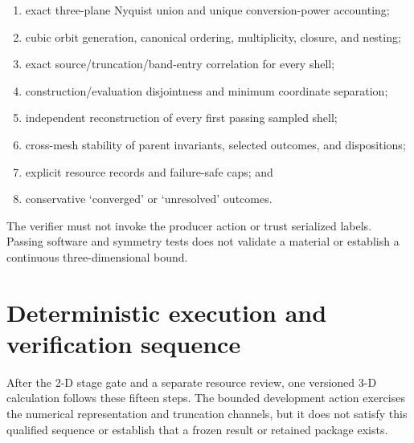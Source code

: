 \documentclass[11pt]{article}
\begin{document}
\begin{enumerate}[label=\arabic*.]
 \item exact three-plane Nyquist union and unique conversion-power accounting;
 \item cubic orbit generation, canonical ordering, multiplicity, closure, and nesting;
 \item exact source/truncation/band-entry correlation for every shell;
 \item construction/evaluation disjointness and minimum coordinate separation;
 \item independent reconstruction of every first passing sampled shell;
 \item cross-mesh stability of parent invariants, selected outcomes, and dispositions;
 \item explicit resource records and failure-safe caps; and
 \item conservative `converged' or `unresolved' outcomes.
\end{enumerate}

The verifier must not invoke the producer action or trust serialized labels. Passing
software and symmetry tests does not validate a material or establish a continuous
three-dimensional bound.

\section{Deterministic execution and verification sequence}

After the 2-D stage gate and a separate resource review, one versioned 3-D calculation
follows these fifteen steps. The bounded development action exercises the numerical
representation and truncation channels, but it does not satisfy this qualified sequence
or establish that a frozen result or retained package exists.
\end{document}
